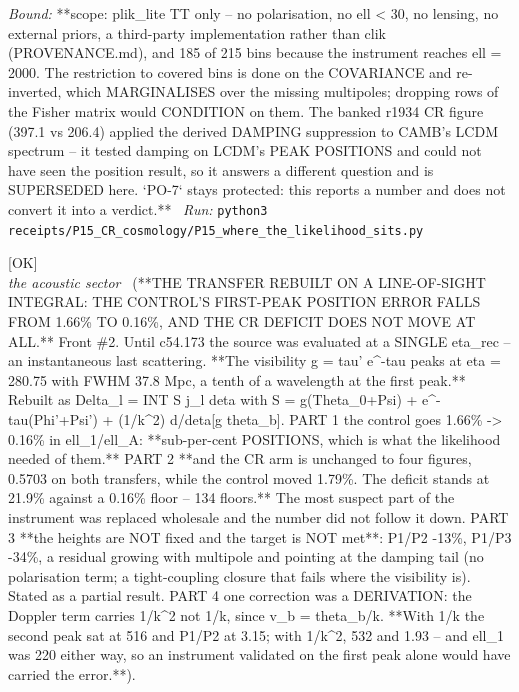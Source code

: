 \begin{description}
 \emph{Bound:} **scope: plik\_lite TT only -- no polarisation, no ell < 30, no lensing, no external priors, a third-party implementation rather than clik (PROVENANCE.md), and 185 of 215 bins because the instrument reaches ell = 2000. The restriction to covered bins is done on the COVARIANCE and re-inverted, which MARGINALISES over the missing multipoles; dropping rows of the Fisher matrix would CONDITION on them. The banked r1934 CR figure (397.1 vs 206.4) applied the derived DAMPING suppression to CAMB's LCDM spectrum -- it tested damping on LCDM's PEAK POSITIONS and could not have seen the position result, so it answers a different question and is SUPERSEDED here. `PO-7` stays protected: this reports a number and does not convert it into a verdict.**
\ \emph{Run:} \texttt{python3 receipts/P15\_CR\_cosmology/P15\_where\_the\_likelihood\_sits.py}
\item[\rcptlabel{P15_the_line_of_sight_transfer}{P15R68}\textbf{P15R68}\quad\texttt{P15\_the\_line\_of\_sight\_transfer}]\hfill\textsf{[OK]}\\
\textit{the acoustic sector} \ (**THE TRANSFER REBUILT ON A LINE-OF-SIGHT INTEGRAL: THE CONTROL'S FIRST-PEAK POSITION ERROR FALLS FROM 1.66\% TO 0.16\%, AND THE CR DEFICIT DOES NOT MOVE AT ALL.** Front \#2. Until c54.173 the source was evaluated at a SINGLE eta\_rec -- an instantaneous last scattering. **The visibility g = tau' e\textasciicircum{}-tau peaks at eta = 280.75 with FWHM 37.8 Mpc, a tenth of a wavelength at the first peak.** Rebuilt as Delta\_l = INT S j\_l deta with S = g(Theta\_0+Psi) + e\textasciicircum{}-tau(Phi'+Psi') + (1/k\textasciicircum{}2) d/deta[g theta\_b]. PART 1 the control goes 1.66\% -> 0.16\% in ell\_1/ell\_A: **sub-per-cent POSITIONS, which is what the likelihood needed of them.** PART 2 **and the CR arm is unchanged to four figures, 0.5703 on both transfers, while the control moved 1.79\%. The deficit stands at 21.9\% against a 0.16\% floor -- 134 floors.** The most suspect part of the instrument was replaced wholesale and the number did not follow it down. PART 3 **the heights are NOT fixed and the target is NOT met**: P1/P2 -13\%, P1/P3 -34\%, a residual growing with multipole and pointing at the damping tail (no polarisation term; a tight-coupling closure that fails where the visibility is). Stated as a partial result. PART 4 one correction was a DERIVATION: the Doppler term carries 1/k\textasciicircum{}2 not 1/k, since v\_b = theta\_b/k. **With 1/k the second peak sat at 516 and P1/P2 at 3.15; with 1/k\textasciicircum{}2, 532 and 1.93 -- and ell\_1 was 220 either way, so an instrument validated on the first peak alone would have carried the error.**). 

\end{description}
